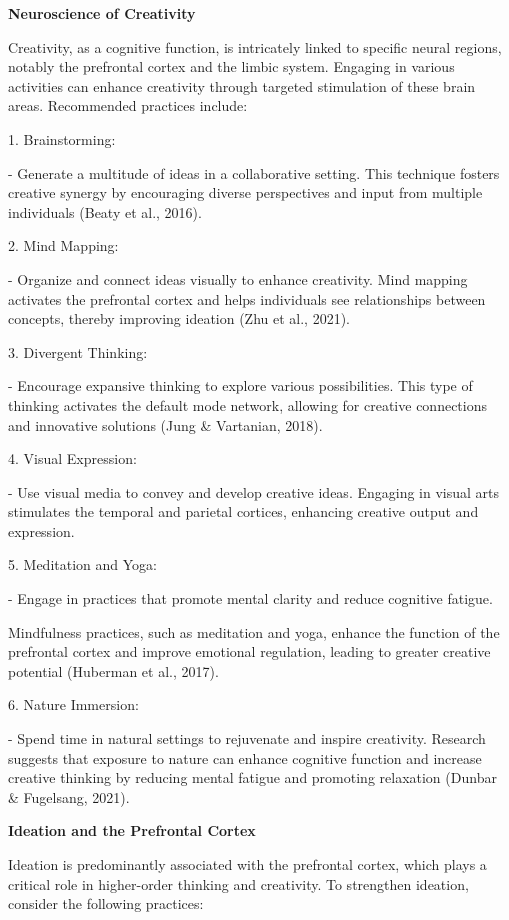 \documentclass[
]{article}
\begin{document}
\textbf{Neuroscience of Creativity}

Creativity, as a cognitive function, is intricately linked to specific
neural regions, notably the prefrontal cortex and the limbic system.
Engaging in various activities can enhance creativity through targeted
stimulation of these brain areas. Recommended practices include:

1. Brainstorming:

- Generate a multitude of ideas in a collaborative setting. This
technique fosters creative synergy by encouraging diverse perspectives
and input from multiple individuals (Beaty et al., 2016).

2. Mind Mapping:

- Organize and connect ideas visually to enhance creativity. Mind
mapping activates the prefrontal cortex and helps individuals see
relationships between concepts, thereby improving ideation (Zhu et al.,
2021).

3. Divergent Thinking:

- Encourage expansive thinking to explore various possibilities. This
type of thinking activates the default mode network, allowing for
creative connections and innovative solutions (Jung \& Vartanian, 2018).

4. Visual Expression:

- Use visual media to convey and develop creative ideas. Engaging in
visual arts stimulates the temporal and parietal cortices, enhancing
creative output and expression.

5. Meditation and Yoga:

- Engage in practices that promote mental clarity and reduce cognitive
fatigue.

Mindfulness practices, such as meditation and yoga, enhance the function
of the prefrontal cortex and improve emotional regulation, leading to
greater creative potential (Huberman et al., 2017).

6. Nature Immersion:

- Spend time in natural settings to rejuvenate and inspire creativity.
Research suggests that exposure to nature can enhance cognitive function
and increase creative thinking by reducing mental fatigue and promoting
relaxation (Dunbar \& Fugelsang, 2021).

\textbf{Ideation and the Prefrontal Cortex}

Ideation is predominantly associated with the prefrontal cortex, which
plays a critical role in higher-order thinking and creativity. To
strengthen ideation, consider the following practices:
\end{document}

